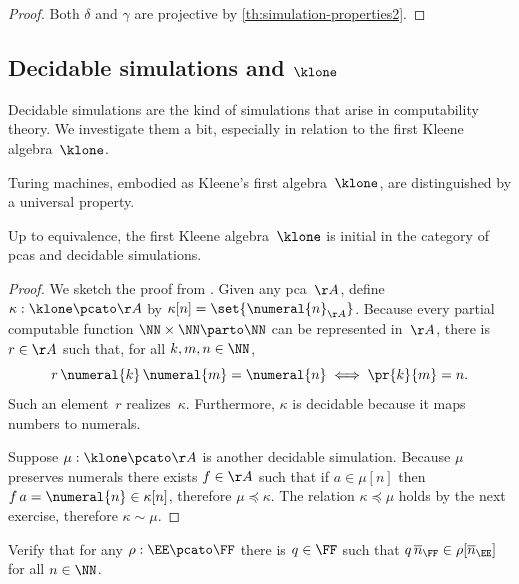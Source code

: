 \begin{proof}
  Both $\delta$ and $\gamma$ are projective by
  \cref{th:simulation-properties2}.
\end{proof}

\subsection[\texorpdfstring{Decidable simulations and $\klone$}{Decidable simulations and K1}]
{Decidable simulations and $\klone$}
\label{sec:decidable-simulations}

Decidable simulations are the kind of simulations that arise in computability theory.
We investigate them a bit, especially in relation to the first Kleene algebra~$\klone$.

Turing machines, embodied as Kleene's first algebra~$\klone$, are distinguished by a universal property.

\begin{theorem}
  Up to equivalence, the first Kleene algebra~$\klone$ is initial in the category of pcas and decidable simulations.
\end{theorem}

\begin{proof}
  We sketch the proof from \cite[Theorem 2.4.18]{Longley:95}. Given any pca~$\AA$, define $\kappa : \klone \pcato \AA$ by $\kappa[n] = \set{\numeral{n}_{\AA}}$. Because every partial computable function $\NN \times \NN \parto \NN$ can be represented in~$\AA$, there is $r \in \AA$ such that, for all $k, m, n \in \NN$,
  \begin{equation*}
    r \, \numeral{k} \, \numeral{m} = \numeral{n} \iff \pr{k}{m} = n.
  \end{equation*}
  Such an element~$r$ realizes~$\kappa$. Furthermore, $\kappa$ is decidable because it maps numbers to numerals.

  Suppose $\mu : \klone \pcato \AA$ is another decidable simulation. Because $\mu$ preserves numerals there exists $f \in \AA$ such that if $a \in \mu[n]$ then $f \, a = \numeral{n} \in \kappa[n]$, therefore $\mu \preceq \kappa$. The relation $\kappa \preceq \mu$ holds by the next exercise, therefore $\kappa \sim \mu$.
\end{proof}

\begin{exercise}
  Verify that for any $\rho : \EE \pcato \FF$ there is $q \in \FF$ such that $q \, \overline{n}_{\FF} \in \rho[\overline{n}_{\EE}]$ for all $n \in \NN$.
\end{exercise}

